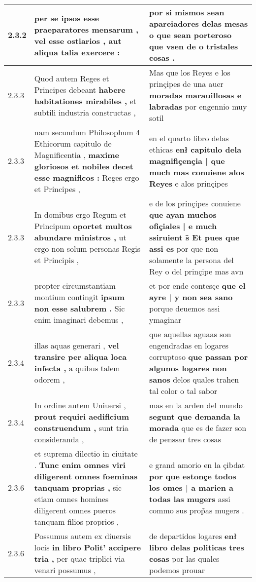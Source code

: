 \begin{tabular}{|p{1cm}|p{6.5cm}|p{6.5cm}|}
2.3.2 & per se ipsos esse praeparatores mensarum , \textbf{ vel esse ostiarios , } aut aliqua talia exercere : & por si mismos sean apareiadores delas mesas \textbf{ o que sean porteroso } que vsen de o tristales cosas . \\\hline
2.3.3 & Quod autem Reges et Principes debeant \textbf{ habere habitationes mirabiles , } et subtili industria constructas , & Mas que los Reyes e los prinçipes de una auer \textbf{ moradas marauillosas e labradas } por engennio muy sotil \\\hline
2.3.3 & nam secundum Philosophum 4 Ethicorum capitulo de Magnificentia , \textbf{ maxime gloriosos et nobiles decet esse magnificos : } Reges ergo et Principes , & en el quarto libro delas ethicas \textbf{ enł capitulo dela magnifiçençia | que much mas conuiene alos Reyes } e alos prinçipes \\\hline
2.3.3 & In domibus ergo Regum et Principum \textbf{ oportet multos abundare ministros , } ut ergo non solum personas Regis et Principis , & e de los prinçipes conuiene \textbf{ que ayan muchos ofiçiales | e much ssiruient s̃ Et pues que assi es } por que non solamente la persona del Rey o del prinçipe mas avn \\\hline
2.3.3 & propter circumstantiam montium contingit \textbf{ ipsum non esse salubrem . } Sic enim imaginari debemus , & et por ende contesçe \textbf{ que el ayre | y non sea sano } porque deuemos assi ymaginar \\\hline
2.3.4 & illas aquas generari , \textbf{ vel transire per aliqua loca infecta , } a quibus talem odorem , & que aquellas aguaas son engendradas en logares corruptoso \textbf{ que passan por algunos logares non sanos } delos quales trahen tal color o tal sabor \\\hline
2.3.4 & In ordine autem Uniuersi , \textbf{ prout requiri aedificium construendum , } sunt tria consideranda , & mas en la arden del mundo \textbf{ segunt que demanda la morada } que es de fazer son de penssar tres cosas \\\hline
2.3.6 & et suprema dilectio in ciuitate . \textbf{ Tunc enim omnes viri diligerent omnes foeminas tanquam proprias , } sic etiam omnes homines diligerent omnes pueros tanquam filios proprios , & e grand amorio en la çibdat \textbf{ por que estonçe todos los omes | a marien a todas las mugers } assi commo sus prop̃as mugers . \\\hline
2.3.6 & Possumus autem ex diuersis locis \textbf{ in libro Polit’ accipere tria , } per quae triplici via venari possumus , & de departidos logares \textbf{ enł libro delas politicas tres cosas } por las quales podemos prouar \\\hline

\end{tabular}
